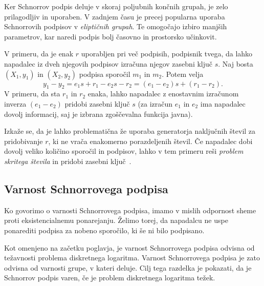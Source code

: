 Ker Schnorrov podpis deluje v skoraj poljubnih končnih grupah, je zelo prilagodljiv in uporaben.
V zadnjem času je precej popularna uporaba Schnorrovih podpisov v \textit{eliptičnih grupah}.
Te omogočajo izbiro manjših parametrov, kar naredi podpis bolj časovno in prostorsko učinkovit.

\begin{opomba}
\label{opomba:nonce}
    V primeru, da je enak $r$ uporabljen pri več podpisih, podpisnik tvega, da lahko napadalec iz
    dveh njegovih podpisov izračuna njegov zasebni ključ $s$. Naj bosta $(X_1, y_1)$ in $(X_2, y_2)$
    podpisa sporočil $m_1$ in $m_2$. Potem velja
    $$
    y_1 - y_2 = e_1 s + r_1 - e_2 s - r_2 = (e_1 - e_2)s + (r_1 - r_2).
    $$
    V primeru, da sta $r_1$ in $r_2$ enaka, lahko napadalec z enostavnim izračunom inverza $(e_1 - e_2)$
    pridobi zasebni ključ $s$ (za izračun $e_1$ in $e_2$ ima napadalec dovolj informacij, saj je
    izbrana zgoščevalna funkcija javna).

    Izkaže se, da je lahko problematična že uporaba generatorja naključnih števil za pridobivanje
    $r$, ki ne vrača enakomerno porazdeljenih števil. Če napadalec dobi dovolj veliko količino
    sporočil in podpisov, lahko v tem primeru reši \textit{problem skritega števila} in pridobi
    zasebni ključ~\cite{tibouchi2017attacks}.
\end{opomba}

\subsection{Varnost Schnorrovega podpisa}
\label{sec:schnorr-sec}
Ko govorimo o varnosti Schnorrovega podpisa, imamo v mislih odpornost sheme proti eksistencialnemu
ponarejanju. Želimo torej, da napadalcu ne uspe ponarediti podpisa za nobeno sporočilo, ki še ni
bilo podpisano.

Kot omenjeno na začetku poglavja, je varnost Schnorrovega podpisa odvisna od težavnosti problema
diskretnega logaritma. Varnost Schnorrovega podpisa je zato odvisna od varnosti grupe, v kateri deluje.
Cilj tega razdelka je pokazati, da je Schnorrov podpis varen, če je problem diskretnega logaritma
težek.


